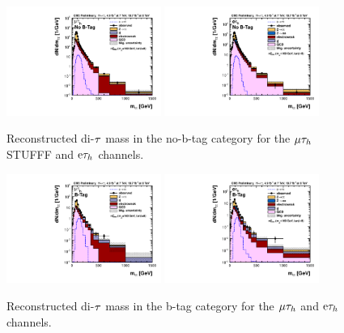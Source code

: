  
\begin{figure}[!h]\begin{center}
 \includegraphics[width=0.45\textwidth]{MSSM/PLOTS/muTau_nobtag_postfit_7+8TeV_LOG.pdf}
 \includegraphics[width=0.45\textwidth]{MSSM/PLOTS/eleTau_nobtag_postfit_7+8TeV_LOG.pdf}
 \caption{Reconstructed di-$\mathrm{\tau}$ mass in the no-b-tag category for the $\mathrm{\mu}\mathrm{\tau}_{h}$ STUFFF and $\mathrm{e}\mathrm{\tau}_{h}$ channels.}
  \label{fig:mass_no_b_tag}\end{center}\end{figure}


\begin{figure}[!h]\begin{center}
 \includegraphics[width=0.45\textwidth]{MSSM/PLOTS/muTau_btag_postfit_7+8TeV_LOG.pdf}
 \includegraphics[width=0.45\textwidth]{MSSM/PLOTS/eleTau_btag_postfit_7+8TeV_LOG.pdf}
 \caption{Reconstructed di-$\mathrm{\tau}$ mass in the b-tag category for the $\mathrm{\mu}\mathrm{\tau}_{h}$ and $\mathrm{e}\mathrm{\tau}_{h}$ channels.}
  \label{fig:mass_b_tag}\end{center}\end{figure}

